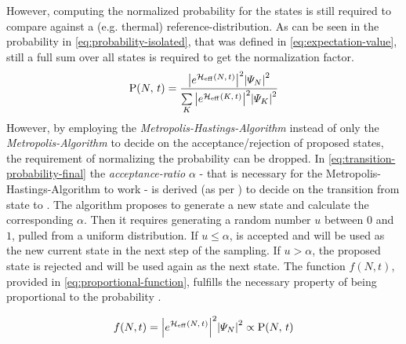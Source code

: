 However, computing the normalized probability for the states is still required to compare against a (e.g. thermal) reference-distribution.
As can be seen in the probability in \autoref{eq:probability-isolated}, that was defined in \autoref{eq:expectation-value}, still a full sum over all states is required to get the normalization factor.
\begin{equation}
    \label{eq:probability-isolated}
    \probabilityOf{N}{t} = \frac{
        \absSquare{e^{\HeffOft}} \absSquare{\psiN} 
    }{
        \lsum[K] \absSquare{e^{\HeffOft[K]}} \absSquare{\psiN[K]} 
    }
\end{equation}
However, by employing the \emph{Metropolis-Hastings-Algorithm} instead of only the \emph{Metropolis-Algorithm} to decide on the acceptance/rejection of proposed states, the requirement of normalizing the probability can be dropped.
In \autoref{eq:transition-probability-final} the \emph{acceptance-ratio} $\alpha$ - that is necessary for the Metropolis-Hastings-Algorithm to work - is derived (as per \cite{metropolisHastingsAlgorithmGeneral}) to decide on the transition from state \ketN[N] to .
The algorithm proposes to generate a new state  and calculate the corresponding $\alpha$. Then it requires generating a random number $u$ between $0$ and $1$, pulled from a uniform distribution.
If $u \leq \alpha$,  is accepted and will be used as the new current state in the next step of the sampling. 
If $u>\alpha$, the proposed state is rejected and \ketN[N] will be used again as the next state.
The function $f(N,t)$, provided in \autoref{eq:proportional-function}, fulfills the necessary property of being proportional to the probability  .

\begin{equation}
    \label{eq:proportional-function}
    f(N,t) = \absSquare{e^{\HeffOft}} \absSquare{\psiN} \propto \probabilityOf{N}{t}
\end{equation}

